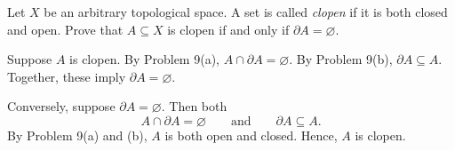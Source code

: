 \documentclass[answers,12pt,addpoints]{exam}
\begin{document}
\begin{questions}
\begin{parts}
\end{parts}


\question
Let $X$ be an arbitrary topological space. A set is called
\emph{clopen} if it is both closed and open.
Prove that $A\subseteq X$ is clopen if and only if
$\partial A=\varnothing$.

\begin{solution}
Suppose $A$ is clopen. By Problem 9(a), $A\cap\partial A=\varnothing$.
By Problem 9(b), $\partial A\subseteq A$. Together, these imply
$\partial A=\varnothing$.

Conversely, suppose $\partial A=\varnothing$. Then both
\[
A\cap\partial A=\varnothing
\qquad\text{and}\qquad
\partial A\subseteq A.
\]
By Problem 9(a) and (b), $A$ is both open and closed.
Hence, $A$ is clopen.
\end{solution}

\end{questions}
\end{document}
